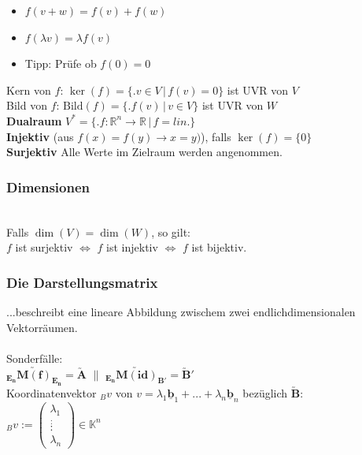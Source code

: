 \documentclass[6pt,a4paper]{scrartcl}
\newcommand{\iset}[2]{\ensuremath{\bigl\{ \bigl. #1 \, \bigr| \, #2 \bigr\}}}					%
\newcommand{\eset}[1]{\ensuremath{\bigl\{#1\bigr\}}}											%
\newcommand{\ma}[1]{\ensuremath{\utilde{\boldsymbol {#1}}}}										%
\renewcommand{\vec}[1]{\ensuremath{\underline{\boldsymbol {#1}}}}								%
\renewcommand{\emph}[1]{\textbf{#1}}															%
\newcommand{\ra}[0]{\ensuremath{\rightarrow}} 									%
\begin{document}
\begin{multicols}{4}
\begin{itemize}\itemsep0pt
	\item $f(v+w) = f(v) + f(w)$
	\item $f(\lambda v) = \lambda f(v)$
	\item Tipp: Prüfe ob $f(0) = 0$
\end{itemize}
Kern von $f$: $\ker (f) = \iset{v \in V}{f(v) = 0}$ ist UVR von $V$\\
Bild von $f$: $\mathrm{Bild}(f) = \iset{f(v)}{v \in V}$ ist UVR von $W$\\
\emph{Dualraum} $V^* = \iset{f:\mathbb R^n \rightarrow \mathbb R}{f=lin.}$\\
\emph{Injektiv} (aus $f(x) = f(y) \ra x = y)$), falls $\ker(f) = \eset{0}$ \\
\emph{Surjektiv} Alle Werte im Zielraum werden angenommen.

\subsubsection{Dimensionen}
\\
Falls $\dim(V) = \dim(W)$, so gilt: \\
$f$ ist surjektiv $ \Leftrightarrow$ $f$ ist  injektiv $\Leftrightarrow$ $f$ ist  bijektiv. \\

\subsubsection{Die Darstellungsmatrix}
...beschreibt eine lineare Abbildung zwischem zwei endlichdimensionalen Vektorräumen.\\
\\
Sonderfälle: \\
$\ma{_{E_n} M(f)_{E_n}} = \ma{A}$ \quad $\|$ \quad
$\ma{_{E_n} M(id)_{B'}} = \ma B'$ \\ 
Koordinatenvektor $_B v$ von $v = \lambda_1 \vec b_1 + ... + \lambda_n \vec b_n $ bezüglich $\ma B$: \\
$_B v := \begin{pmatrix} \lambda_1 \\ \overset{:}: \\ \lambda_n \end{pmatrix} \in \mathbb K^n$\\



\end{multicols}
\end{document}
